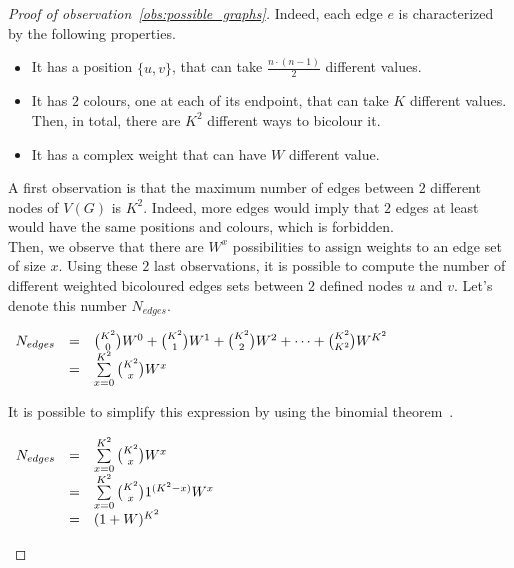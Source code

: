 \begin{proof}[Proof of observation~\ref{obs:possible_graphs}]
    Indeed, each edge $e$ is characterized by the following properties.
    \begin{itemize}
        \item It has a position $\{u, v\}$, that can take $\frac{n \cdot (n -1)}{2}$ different values.
        \item It has $2$ colours, one at each of its endpoint, that can take $K$ different values.
            Then, in total, there are $K^2$ different ways to bicolour it.
        \item It has a complex weight that can have $W$ different value.
    \end{itemize}

    A first observation is that the maximum number of edges between $2$ different nodes of $V(G)$ is $K^2$.
    Indeed, more edges would imply that $2$ edges at least would have the same positions and colours, which is forbidden.\\

    Then, we observe that there are $W^x$ possibilities to assign weights to an edge set of size $x$.
    Using these $2$ last observations, it is possible to compute the number of different weighted bicoloured edges sets between $2$ defined nodes $u$ and $v$.
    Let's denote this number $N_{edges}$.

    \begin{center}
        $\begin{array}{r c l}
             N_{edges} & = & {K^2 \choose 0} W^0 + {K^2 \choose 1} W^1 + {K^2 \choose 2} W^2 + \cdots + {K^2 \choose K^2} W^{K^2} \\
                       & = & \sum\limits_{x=0}^{K^2} {K^2 \choose x} W^x
        \end{array}$
    \end{center}

    It is possible to simplify this expression by using the binomial theorem~\cite{wikipediaBinomialTheorem}.   %

    \begin{center}
        $\begin{array}{r c l}
             N_{edges} & = & \sum\limits_{x=0}^{K^2} {K^2 \choose x} W^x               \\
                       & = & \sum\limits_{x=0}^{K^2} {K^2 \choose x} 1^{(K^2 - x)} W^x \\
                       & = & (1 + W)^{K^2}
        \end{array}$
    \end{center}


\end{proof}
